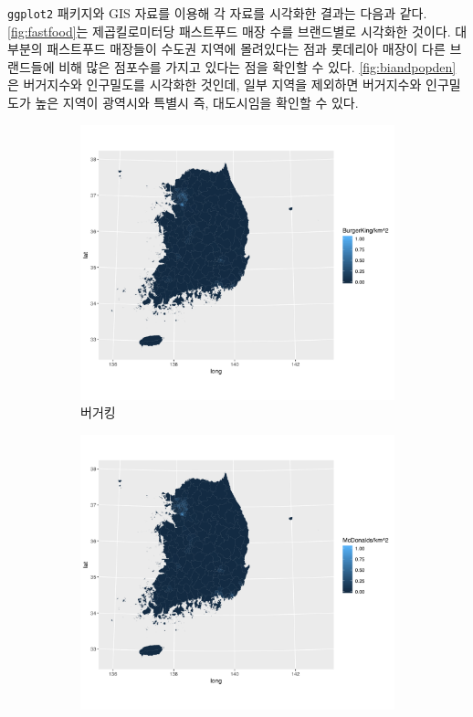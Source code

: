 \documentclass{scrartcl}
\begin{document}
\texttt{ggplot2} 패키지와 GIS 자료를 이용해 각 자료를 시각화한 결과는 다음과 같다. \autoref{fig:fastfood}는 제곱킬로미터당 패스트푸드 매장 수를 브랜드별로 시각화한 것이다. 대부분의 패스트푸드 매장들이 수도권 지역에 몰려있다는 점과 롯데리아 매장이 다른 브랜드들에 비해 많은 점포수를 가지고 있다는 점을 확인할 수 있다. \autoref{fig:biandpopden}은 버거지수와 인구밀도를 시각화한 것인데, 일부 지역을 제외하면 버거지수와 인구밀도가 높은 지역이 광역시와 특별시 즉, 대도시임을 확인할 수 있다.

\begin{figure}[!ht]
    \centering
    \begin{subfigure}[b]{0.475\textwidth}
        \centering
        \includegraphics[width=\textwidth]{../figs/B_sig.png}
        \caption{버거킹}\label{fig:fastfood:B}
    \end{subfigure}
    \hfill
    \begin{subfigure}[b]{0.475\textwidth}  
        \centering 
        \includegraphics[width=\textwidth]{../figs/M_sig.png}

\end{subfigure}
\end{figure}
\end{document}
